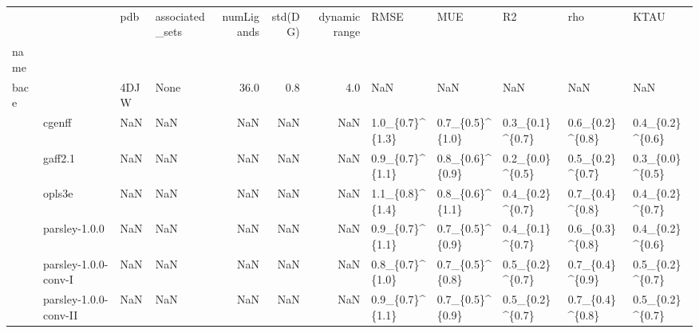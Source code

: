 \begin{tabular}{llllrrrlllll}
\toprule
     &                       &         pdb &     associated\_sets &  numLigands &  std(DG) &  dynamic range &             RMSE &              MUE &               R2 &                rho &              KTAU \\
name & {} &             &                     &             &          &                &                  &                  &                  &                    &                   \\
\midrule
bace &                       &        4DJW &                None &        36.0 &      0.8 &            4.0 &              NaN &              NaN &              NaN &                NaN &               NaN \\
     & cgenff &         NaN &                 NaN &         NaN &      NaN &            NaN &  1.0\_\{0.7\}\textasciicircum \{1.3\} &  0.7\_\{0.5\}\textasciicircum \{1.0\} &  0.3\_\{0.1\}\textasciicircum \{0.7\} &    0.6\_\{0.2\}\textasciicircum \{0.8\} &   0.4\_\{0.2\}\textasciicircum \{0.6\} \\
     & gaff2.1 &         NaN &                 NaN &         NaN &      NaN &            NaN &  0.9\_\{0.7\}\textasciicircum \{1.1\} &  0.8\_\{0.6\}\textasciicircum \{0.9\} &  0.2\_\{0.0\}\textasciicircum \{0.5\} &    0.5\_\{0.2\}\textasciicircum \{0.7\} &   0.3\_\{0.0\}\textasciicircum \{0.5\} \\
     & opls3e &         NaN &                 NaN &         NaN &      NaN &            NaN &  1.1\_\{0.8\}\textasciicircum \{1.4\} &  0.8\_\{0.6\}\textasciicircum \{1.1\} &  0.4\_\{0.2\}\textasciicircum \{0.7\} &    0.7\_\{0.4\}\textasciicircum \{0.8\} &   0.4\_\{0.2\}\textasciicircum \{0.7\} \\
     & parsley-1.0.0 &         NaN &                 NaN &         NaN &      NaN &            NaN &  0.9\_\{0.7\}\textasciicircum \{1.1\} &  0.7\_\{0.5\}\textasciicircum \{0.9\} &  0.4\_\{0.1\}\textasciicircum \{0.7\} &    0.6\_\{0.3\}\textasciicircum \{0.8\} &   0.4\_\{0.2\}\textasciicircum \{0.6\} \\
     & parsley-1.0.0-conv-I &         NaN &                 NaN &         NaN &      NaN &            NaN &  0.8\_\{0.7\}\textasciicircum \{1.0\} &  0.7\_\{0.5\}\textasciicircum \{0.8\} &  0.5\_\{0.2\}\textasciicircum \{0.7\} &    0.7\_\{0.4\}\textasciicircum \{0.9\} &   0.5\_\{0.2\}\textasciicircum \{0.7\} \\
     & parsley-1.0.0-conv-II &         NaN &                 NaN &         NaN &      NaN &            NaN &  0.9\_\{0.7\}\textasciicircum \{1.1\} &  0.7\_\{0.5\}\textasciicircum \{0.9\} &  0.5\_\{0.2\}\textasciicircum \{0.7\} &    0.7\_\{0.4\}\textasciicircum \{0.8\} &   0.5\_\{0.2\}\textasciicircum \{0.7\} \\

\end{tabular}
